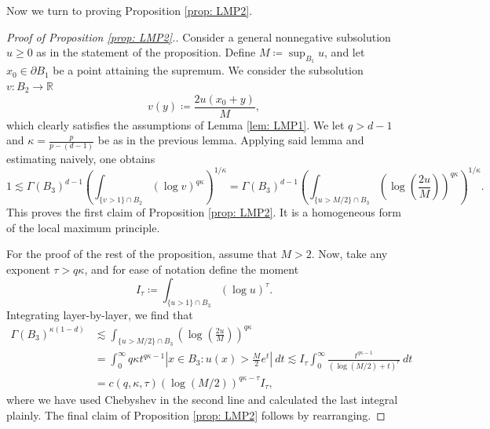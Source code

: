 \documentclass[reqno]{amsart}
\numberwithin{equation}{section}
\numberwithin{equation}{section}
\newcommand{\R}{\mathbb R}
\newcommand{\ds}{\displaystyle}
\begin{document}
Now we turn to proving Proposition \ref{prop: LMP2}.
\begin{proof}[Proof of Proposition \ref{prop: LMP2}.]
Consider a general nonnegative subsolution $u\ge 0$ as in the statement of the proposition. Define $M \coloneqq \ds \sup_{B_1} u$, and let $x_0 \in \partial B_1$ be a point attaining the supremum. We consider the subsolution $v: B_2 \to \R$
$$v(y) \coloneqq \frac{2u(x_0 + y)}{M},$$
which clearly satisfies the assumptions of Lemma \ref{lem: LMP1}. We let $q>d-1$ and $\kappa = \ds \frac{p}{p-(d-1)}$ be as in the previous lemma. Applying said lemma and estimating naively, one obtains
\begin{equation}
\label{eq: firstlogmomentintegral}
    1 \lesssim \Gamma(B_3)^{d-1} \left(\int_{\{v>1\} \cap B_2} (\log v)^{q\kappa}\right)^{1/\kappa} = \Gamma(B_3)^{d-1}\left(\int_{\{u>M/2\} \cap B_3} \left(\log \left(\frac{2u}{M}\right)\right)^{q\kappa}\right)^{1/\kappa}.
\end{equation}
This proves the first claim of Proposition \ref{prop: LMP2}. It is a homogeneous form of the local maximum principle. 

For the proof of the rest of the proposition, assume that $M>2$. Now, take any exponent $\tau>q\kappa$, and for ease of notation define the moment
$$I_\tau \coloneqq \int_{\{u>1\} \cap B_3} (\log u)^\tau.$$
Integrating layer-by-layer, we find that
\begin{align}
\Gamma(B_3)^{\kappa(1-d)} &\lesssim \int_{\{u>M/2\} \cap B_3} \left(\log\left(\frac{2u}{M}\right)\right)^{q\kappa}\\
&= \int_0^\infty q\kappa t^{q\kappa -1} \left|x \in B_3 : u(x) > \frac{M}{2}e^t\right| \ dt \lesssim  I_\tau \int_0^\infty \frac{t^{q\kappa -1}}{\left(\log(M/2) + t\right)^\tau} \ dt\\
&= c(q,\kappa, \tau) (\log(M/2))^{q\kappa - \tau} I_\tau,
\end{align}
where we have used Chebyshev in the second line and calculated the last integral plainly. The final claim of Proposition \ref{prop: LMP2} follows by rearranging.

\end{proof}
\end{document}
